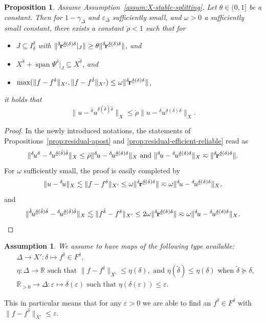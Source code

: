 \documentclass[11pt,a4paper,oneside,english]{amsart}
\numberwithin{equation}{section}
\numberwithin{theorem}{section}
\newtheorem{assum}[theorem]{Assumption}
\newtheorem{prop}[theorem]{Proposition}
\theoremstyle{definition}
\newcommand{\R}{\mathbb{R}}
\newcommand{\eps}{\varepsilon}
\DeclareMathOperator{\spann}{span}
\newcommand{\udelta}{{\underline{\delta}}}
\begin{document}
\begin{prop}
  \label{prop:contraction}
  Assume Assumption~\ref{assum:X-stable-splitting}. Let $\theta \in (0,1]$ be a constant. Then for $1-\gamma_\Delta$ and $\eps_\Delta$
  sufficiently small, and $\omega>0$ a sufficiently small constant, there exists
  a constant $\check{\rho}<1$ such that for 
  \begin{itemize}
    \item $J \subseteq I_\delta^\udelta$ with $\|{}^{\delta\!}{\bf r}^{\udelta(\delta) \delta}|_J\| \geq \theta \|{}^{\delta\!}{\bf r}^{\udelta(\delta) \delta}\|$, and
    \item $X^\delta+\spann \Psi^\delta|_{J} \subseteq X^{\check{\delta}}$, and
    \item $\max(\|f-f^\delta\|_{X'}, \|f-f^{\check{\delta}}\|_{X'}) \leq \omega \|{}^{\delta\!}{\bf r}^{\udelta(\delta) \delta}\|$,
  \end{itemize}
  it holds that
  \[
    \|u-{}^{\check{\delta}\!}u^{\udelta(\check{\delta}) \check{\delta}}\|_X \leq \check{\rho} \|u-{}^{\delta\!}u^{\udelta(\delta)\delta}\|_X.
  \]
\end{prop}
\begin{proof}
  In the newly introduced notations, the statements of Propositions~\ref{prop:residual-apost}
  and \ref{prop:residual-efficient-reliable} read as
  \[
    \|{}^{\delta\!}u^\delta-{}^{\delta\!}u^{\udelta(\check{\delta}) \check{\delta}}\|_X \leq \bar{\rho} \|{}^{\delta\!}u-{}^{\delta\!}u^{\udelta(\delta)\delta}\|_X \text{ and }
    \|{}^{\delta\!}u-{}^{\delta\!}u^{\udelta(\delta)\delta}\|_X \eqsim \|{}^{\delta\!}{\bf r}^{\udelta(\delta) \delta}\|.
  \]
  For $\omega$ sufficiently small, the proof is easily completed by
  \[
    \|u-{}^{\delta\!}u\|_X \lesssim \|f-f^\delta\|_{X'} \leq \omega \|{}^{\delta\!}{\bf r}^{\udelta(\delta) \delta}\| \eqsim \omega \|{}^{\delta\!}u-{}^{\delta\!}u^{\udelta(\delta)\delta}\|_X,
  \]
  and
  \[
    \|{}^{\check{\delta}\!}u^{\udelta(\check{\delta}) \check{\delta}}-{}^{\delta\!}u^{\udelta(\check{\delta}) \check{\delta}}\|_X \lesssim
    \|f^{\check{\delta}}-f^\delta\|_{X'}
    \leq 2 \omega \|{}^{\delta\!}{\bf r}^{\udelta(\delta) \delta}\|\eqsim \omega \|{}^{\delta\!}u-{}^{\delta\!}u^{\udelta(\delta)\delta}\|_X.\qedhere
  \]
\end{proof}

\begin{assum}
  \label{assum:rhs}
  We assume to have maps of the following type available:
  \begin{align*}
    &\Delta \rightarrow X' \colon \delta \mapsto f^\delta \in F^\delta,\\
    &\eta\colon \Delta \rightarrow \R \text{ such that } \|f-f^\delta\|_{X'} \leq \eta(\delta), \text{ and } \eta(\tilde \delta)\leq \eta(\delta) \text{ when } \tilde{\delta} \succeq \delta, \\
    &\R_{>0} \rightarrow \Delta\colon \eps \mapsto \delta(\eps) \text{ such that } \eta(\delta(\eps)) \leq \eps.
  \end{align*}
\end{assum}
This in particular means that for any $\eps>0$ we are able to find an $f^\delta \in F^\delta$
with $\|f-f^\delta\|_{X'} \leq \eps$.
\end{document}
